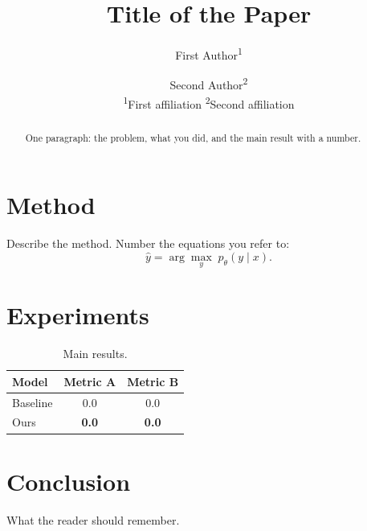 \documentclass[10pt,twocolumn]{article}
\title{Title of the Paper}
\author{First Author\textsuperscript{1} \and Second Author\textsuperscript{2} \\[4pt] \textsuperscript{1}First affiliation \quad \textsuperscript{2}Second affiliation}
\date{}
\begin{document}
\maketitle

\begin{abstract}
One paragraph: the problem, what you did, and the main result with a number.
\end{abstract}



\section{Method}
Describe the method. Number the equations you refer to:
\begin{equation}
  \hat{y} = \arg\max_{y} \; p_\theta(y \mid x).
  \label{eq:decode}
\end{equation}

\section{Experiments}
\begin{table}[t]
  \centering
  \caption{Main results.}
  \begin{tabular}{lcc}
    \toprule
    Model & Metric A & Metric B \\
    \midrule
    Baseline & 0.0 & 0.0 \\
    Ours & \textbf{0.0} & \textbf{0.0} \\
    \bottomrule
  \end{tabular}
\end{table}

\section{Conclusion}
What the reader should remember.



\end{document}
